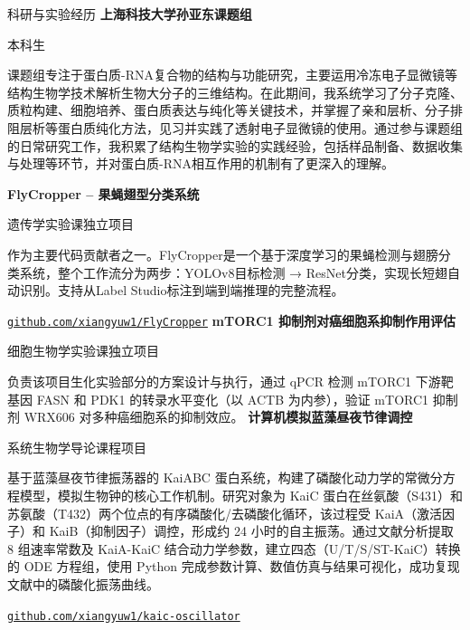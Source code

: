 \begin{rubric}{科研与实验经历}
\entry*[2024 -- 至今]%
	\textbf{上海科技大学孙亚东课题组}\par
	本科生\par
	课题组专注于蛋白质-RNA复合物的结构与功能研究，主要运用冷冻电子显微镜等结构生物学技术解析生物大分子的三维结构。在此期间，我系统学习了分子克隆、质粒构建、细胞培养、蛋白质表达与纯化等关键技术，并掌握了亲和层析、分子排阻层析等蛋白质纯化方法，见习并实践了透射电子显微镜的使用。通过参与课题组的日常研究工作，我积累了结构生物学实验的实践经验，包括样品制备、数据收集与处理等环节，并对蛋白质-RNA相互作用的机制有了更深入的理解。\par
%
\entry*[2025 秋季]%
	\textbf{FlyCropper -- 果蝇翅型分类系统}\par
	遗传学实验课独立项目\par
	作为主要代码贡献者之一。FlyCropper是一个基于深度学习的果蝇检测与翅膀分类系统，整个工作流分为两步：YOLOv8目标检测 → ResNet分类，实现长短翅自动识别。支持从Label Studio标注到端到端推理的完整流程。\par
	\href{https://github.com/xiangyuw1/FlyCropper}{\texttt{github.com/xiangyuw1/FlyCropper}}
%
\entry*[2025 春季]%
	\textbf{mTORC1 抑制剂对癌细胞系抑制作用评估}\par
	细胞生物学实验课独立项目\par
	负责该项目生化实验部分的方案设计与执行，通过 qPCR 检测 mTORC1 下游靶基因 FASN 和 PDK1 的转录水平变化（以 ACTB 为内参），验证 mTORC1 抑制剂 WRX606 对多种癌细胞系的抑制效应。
%
\entry*[2025 秋季]%
	\textbf{计算机模拟蓝藻昼夜节律调控}\par
	系统生物学导论课程项目\par
	基于蓝藻昼夜节律振荡器的 KaiABC 蛋白系统，构建了磷酸化动力学的常微分方程模型，模拟生物钟的核心工作机制。研究对象为 KaiC 蛋白在丝氨酸（S431）和苏氨酸（T432）两个位点的有序磷酸化/去磷酸化循环，该过程受 KaiA（激活因子）和 KaiB（抑制因子）调控，形成约 24 小时的自主振荡。通过文献分析提取 8 组速率常数及 KaiA-KaiC 结合动力学参数，建立四态（U/T/S/ST-KaiC）转换的 ODE 方程组，使用 Python 完成参数计算、数值仿真与结果可视化，成功复现文献中的磷酸化振荡曲线。\par
	\href{https://github.com/xiangyuw1/kaic-oscillator}{\texttt{github.com/xiangyuw1/kaic-oscillator}}
\end{rubric}
